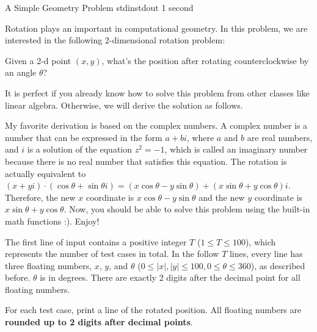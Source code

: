 \begin{problem}{A Simple Geometry Problem}
{stdin}{stdout}
{1 second}{}{}

Rotation plays an important in computational geometry. 
In this problem, we are interested in the following 2-dimensional rotation problem:

\begin{center}
    Given a 2-d point $(x, y)$, what's the position after rotating counterclockwise by an angle $\theta$?
\end{center}

It is perfect if you already know how to solve this problem from other classes like linear algebra.
Otherwise, we will derive the solution as follows.

My favorite derivation is based on the complex numbers. 
A complex number is a number that can be expressed in the form $a + bi$, where $a$ and $b$ are real numbers, and $i$ is a solution of the equation $z^2 = -1$, which is called an imaginary number because there is no real number that satisfies this equation. 
The rotation is actually equivalent to $(x+yi) \cdot (\cos\theta + \sin\theta i) = (x \cos \theta - y \sin \theta) + (x \sin \theta + y \cos \theta) i$.
Therefore, the new $x$ coordinate is $x \cos \theta - y \sin \theta$ and the new $y$ coordinate is $x \sin \theta + y \cos \theta$.
Now, you should be able to solve this problem using the built-in math functions :). Enjoy!

\InputFile

The first line of input contains a positive integer $T$ ($1 \le T \le 100$), which represents the number of test cases in total.
In the follow $T$ lines, every line has three floating numbers, $x$, $y$, and $\theta$ ($0 \le |x|, |y| \le 100, 0 \le \theta \le 360$), as described before. 
$\theta$ is in degrees.
There are exactly 2 digits after the decimal point for all floating numbers.

\OutputFile

For each test case, print a line of the rotated position. All floating numbers are \textbf{rounded up to 2 digits after decimal points}. 

\Examples

\begin{example}
%
\end{example}

\end{problem}
